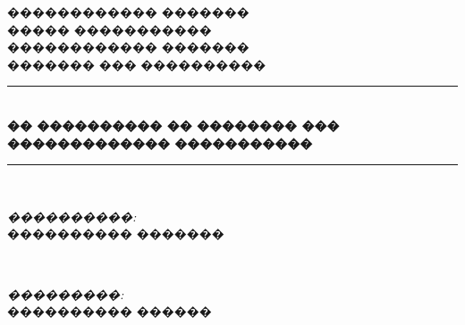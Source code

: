 \documentclass[12pt, a4paper]{book}
\begin{document}
\begin{titlepage}
\pagestyle{empty}
\newcommand{\HRule}{\rule{\linewidth}{0.5mm}}

\center %


\textsc{\LARGE ������������ ������� \\ ����� �����������}\\[1.5cm]
\textsc{\Large ������������ �������}\\[0.5cm] %
\textsc{\large ������� ��� ����������}\\[0.5cm] %


\HRule \\[0.4cm]
{ \huge \bfseries �� ���������� �� �������� ��� ������������� �����������}\\[0.4cm] %
\HRule \\[1.5cm]


\begin{minipage}{0.4\textwidth}
\begin{flushleft} \large
\emph{����������:}\\
���������� \textsc{�������} %
\end{flushleft}
\end{minipage}
~
\begin{minipage}{0.4\textwidth}
\begin{flushright} \large
\emph{���������:} \\
���������� \textsc{������} %
\end{flushright}
\end{minipage}\\[2cm]


\end{titlepage}
\end{document}
